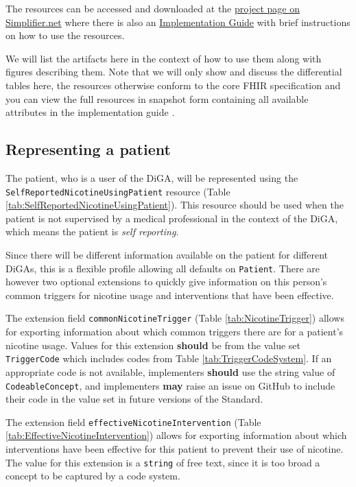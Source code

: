 \documentclass[12px]{report}
\def\code#1{\texttt{#1}} %
\newcommand{\tabpatient}{}
\newcommand{\tabtriggerext}{}
\newcommand{\tabinterventionext}{}
\newcommand{\tabtriggercs}{}
\begin{document}
The resources can be accessed and downloaded at the \href{https://simplifier.net/treat-nicotine-usage-diga}{project page on Simplifier.net} where there is also an \href{https://simplifier.net/guide/self-reported-nicotine-usage-diga/home}{Implementation Guide} \cite{ig} with brief instructions on how to use the resources.

We will list the artifacts here in the context of how to use them along with figures describing them. Note that we will only show and discuss the differential tables here, the resources otherwise conform to the core FHIR specification and you can view the full resources in snapshot form containing all available attributes in the implementation guide \cite{ig}.

\subsection{Representing a patient}
\tabpatient
The patient, who is a user of the DiGA, will be represented using the \code{SelfReportedNicotineUsingPatient} resource (Table \ref{tab:SelfReportedNicotineUsingPatient}). This resource should be used when the patient is not supervised by a medical professional in the context of the DiGA, which means the
patient is \textit{self reporting}.

Since there will be different information available on the patient for different DiGAs, this is a flexible profile allowing all defaults on \code{Patient}. 
There are however two optional extensions to quickly give information on this person's common triggers for nicotine usage and interventions that have been effective.

\tabtriggerext
The extension field \code{commonNicotineTrigger} (Table \ref{tab:NicotineTrigger}) allows for exporting information about which common triggers there are for a patient's nicotine usage. 
Values for this extension \textbf{should} be from the value set \code{TriggerCode} which includes codes from Table \ref{tab:TriggerCodeSystem}. If an appropriate code is not available, implementers \textbf{should} use the string value of \code{CodeableConcept}, 
and implementers \textbf{may} raise an issue on GitHub \cite{github} to include their code in the value set in future versions of the Standard.

\tabtriggercs
\tabinterventionext

The extension field \code{effectiveNicotineIntervention} (Table \ref{tab:EffectiveNicotineIntervention}) allows for exporting information about which interventions have been effective for this patient to prevent their use of nicotine.
The value for this extension is a \code{string} of free text, since it is too broad a concept to be captured by a code system.
\end{document}
